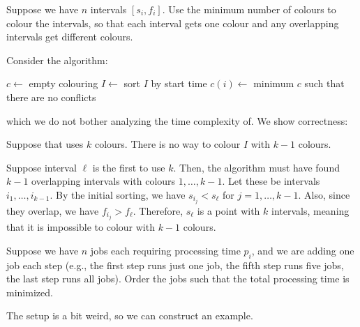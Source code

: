 \begin{problem}
  Suppose we have $n$ intervals $[s_i, f_i]$.
  Use the minimum number of colours to colour the intervals,
  so that each interval gets one colour
  and any overlapping intervals get different colours.
\end{problem}

Consider the algorithm:

\begin{algorithm}[H]
  \caption{\label{alg:g:ic}}
  \begin{algorithmic}[1]
    \State $c \gets$ empty colouring
    \State $I \gets$ sort $I$ by start time
    \State $c(i) \gets$ minimum $c$ such that there are no conflicts
    \EndFor
  \end{algorithmic}
\end{algorithm}

which we do not bother analyzing the time complexity of.
We show correctness:

\begin{prop}
  Suppose that  uses $k$ colours.
  There is no way to colour $I$ with $k-1$ colours.
\end{prop}
\begin{prf}
  Suppose interval $\ell$ is the first to use $k$.
  Then, the algorithm must have found $k-1$ overlapping intervals with colours $1,\dotsc,k-1$.
  Let these be intervals $i_1,\dotsc,i_{k-1}$.
  By the initial sorting, we have $s_{i_j} < s_\ell$ for $j = 1,\dotsc,k-1$.
  Also, since they overlap, we have $f_{i_j} > f_\ell$.
  Therefore, $s_\ell$ is a point with $k$ intervals,
  meaning that it is impossible to colour with $k-1$ colours.
\end{prf}

\begin{problem}
  Suppose we have $n$ jobs each requiring processing time $p_i$,
  and we are adding one job each step (e.g., the first step runs just one job,
  the fifth step runs five jobs, the last step runs all jobs).
  Order the jobs such that the total processing time is minimized.
\end{problem}

The setup is a bit weird, so we can construct an example.

